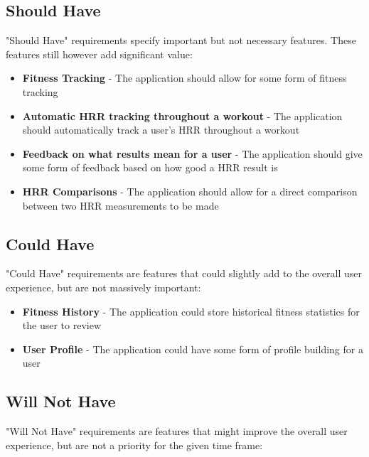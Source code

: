 \documentclass{l4proj}
\begin{document}
\subsection{Should Have}

"Should Have" requirements specify important but not necessary features. These features still however add significant value:

\begin{itemize}
    \item \textbf{Fitness Tracking} - The application should allow for some form of fitness tracking
    \item \textbf{Automatic HRR tracking throughout a workout} - The application should automatically track a user's HRR throughout a workout
    \item \textbf{Feedback on what results mean for a user} - The application should give some form of feedback based on how good a HRR result is
    \item \textbf{HRR Comparisons} - The application should allow for a direct comparison between two HRR measurements to be made 
    
\end{itemize}

\subsection{Could Have}

"Could Have" requirements are features that could slightly add to the overall user experience, but are not massively important:

\begin{itemize}
    \item \textbf{Fitness History} - The application could store historical fitness statistics for the user to review
    \item \textbf{User Profile} - The application could have some form of profile building for a user
\end{itemize}

\subsection{Will Not Have}

"Will Not Have" requirements are features that might improve the overall user experience, but are not a priority for the given time frame:
\end{document}

